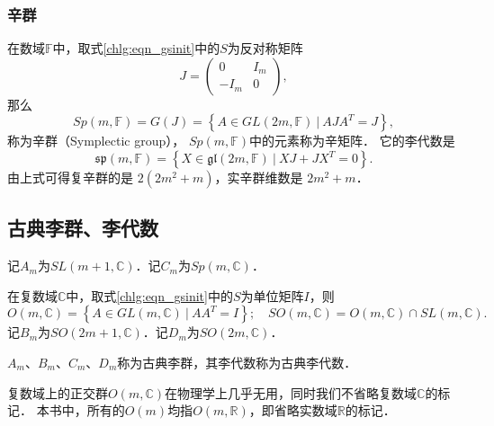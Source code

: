 \subsubsection{辛群}
在数域$\mathbb{F}$中，取式\eqref{chlg:eqn_gsinit}中的$S$为反对称矩阵
\begin{equation}
    J = \begin{pmatrix}
            0 & I_m \\ -I_m & 0
        \end{pmatrix},
\end{equation}
那么
\begin{equation}
    Sp(m,\mathbb{F})=G(J)= \left\{ A \in GL(2m,\mathbb{F})\ |\ A J {A}^T =J \right\},
\end{equation}
称为{\heiti 辛群}（Symplectic group），
$Sp(m,\mathbb{F})$中的元素称为{\heiti 辛矩阵}．
它的李代数是
\begin{equation}
    \mathfrak{sp}(m,\mathbb{F})= \left\{ X \in 
    \mathfrak{gl}(2m,\mathbb{F})\ |\ X J + J {X}^T =0 \right\}.
\end{equation}
由上式可得复辛群的是 $2(2m^2+m)$，实辛群维数是 $2m^2+m$．


\subsection{古典李群、李代数}\label{chlg:sec_clg}
  

记$A_m$为$SL(m+1,\mathbb{C})$．记$C_m$为$Sp(m,\mathbb{C})$．

在复数域$\mathbb{C}$中，取式\eqref{chlg:eqn_gsinit}中的$S$为单位矩阵$I$，则
\begin{equation*}
	O(m,\mathbb{C}) = \left\{ A \in GL(m,\mathbb{C})\ |\ A A^T =I \right\};
	\quad SO(m,\mathbb{C}) = O(m,\mathbb{C}) \cap SL(m,\mathbb{C}).
\end{equation*}
记$B_m$为$SO(2m+1,\mathbb{C})$．记$D_m$为$SO(2m,\mathbb{C})$．

$A_m$、$B_m$、$C_m$、$D_m$称为{\heiti 古典李群}，其李代数称为{\heiti 古典李代数}．

复数域上的正交群$O(m,\mathbb{C})$在物理学上几乎无用，同时我们不省略复数域$\mathbb{C}$的标记．
本书中，所有的$O(m)$均指$O(m,\mathbb{R})$，即省略实数域$\mathbb{R}$的标记．



